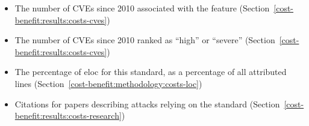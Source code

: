 \begin{table}[ht]
\begin{small}
\begin{itemize}
      \item The number of CVEs since 2010 associated with the feature (Section~\ref{cost-benefit:results:costs-cves})
      \item The number of CVEs since 2010 ranked as ``high'' or ``severe'' (Section~\ref{cost-benefit:results:costs-cves})
      \item The percentage of \gls{eloc} for this
        standard, as a percentage of all attributed lines (Section~\ref{cost-benefit:methodology:costs-loc})
      \item Citations for papers describing attacks relying on the standard (Section~\ref{cost-benefit:results:costs-research})
    \end{itemize}
  \end{small}
  \label{table:megatable}
\end{table}
